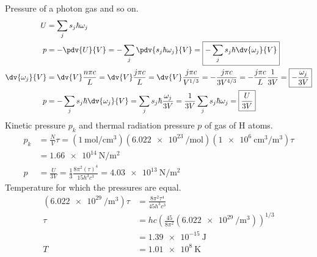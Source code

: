 \documentclass[newpage]{homework}
\begin{document}
\question
Pressure of a photon gas and so on.
\begin{align*}
    U	&=	\sum_j s_j \hbar \omega_j	\\
    p   &=  - \pdv{U}{V}
        =  - \sum_j \pdv{s_j \hbar \omega_j}{V}
        =  \boxed{- \sum_j s_j \hbar \dv{\omega_j}{V}}    \\
    \dv{\omega_j}{V}    &=  \dv{V} \frac{n\pi c}{L}
        =  \dv{V} \frac{j \pi c}{L}
        =  \dv{V} \frac{j \pi c}{V^{1/3}}
        =  -\frac{j \pi c}{3V^{4/3}}  
        =  -\frac{j\pi c}{L} \frac{1}{3V}
        =  \boxed{-\frac{\omega_j}{3V}}    \\
    p   &=  - \sum_j s_j \hbar \dv{\omega_j}{V}
        =  \sum_j s_j \hbar \frac{\omega_j}{3V}  
        =  \frac{1}{3V} \sum_j s_j \hbar \omega_j
        =  \boxed{\frac{U}{3V}} 
\end{align*}
Kinetic pressure $p_k$ and thermal radiation pressure $p$ of gas of H atoms.
\begin{align*}
    p_k	&=	\frac{N}{V}\tau	=  (\SI{1}{\mole/\centi\metre^3})(\SI{6.022e23}{/\mole})(\SI{1e6}{\cm^3/\m^3}) \tau    \\
        &=  \boxed{\SI{1.66e14}{\newton/\metre^2}}  \\
    p   &=  \frac{U}{3V}
        = \frac{1}{3} \frac{8\pi^2 (\tau)^4}{15h^3c^3} = \boxed{\SI{4.03e13}{\newton/\metre^2}}
\end{align*}
Temperature for which the pressures are equal.
\begin{align*}
    (\SI{6.022e29}{/\metre^3}) \tau &=	\frac{8\pi^2 \tau^4}{45h^3c^3}	\\
    \tau   &=  hc \left(\frac{45}{8\pi^2} (\SI{6.022e29}{/\metre^3})\right)^{1/3}    \\
        &=  \SI{1.39e-15}{\joule} \\
    T   &=  \boxed{\SI{1.01e8}{\kelvin}}
\end{align*}
\end{document}
